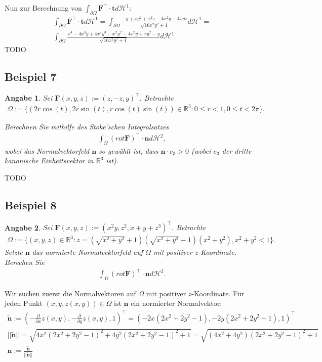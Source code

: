 \documentclass[]{article}
\newtheorem*{angabe*}{Angabe}
\begin{document}
Nun zur Berechnung von $\int_{\partial\Omega} \bm{F}^\top \cdot \bm{t} d\mathcal{H}^1$:
\begin{align*}
	\int_{\partial\Omega} \bm{F}^\top \cdot \bm{t} d\mathcal{H}^1 = \int_{\partial\Omega} \frac{-y + xy^2 + x^2z - 4x^2y - 4xyz}{\sqrt{16x^2y^2+1}} d\mathcal{H}^1 =\\
	\int_{\partial\Omega} \frac{x^4 - 4x^3y + 4x^2y^3 - x^2y^2 - 4x^2y + xy^2 - y}{\sqrt{16x^2y^2+1}} d\mathcal{H}^1
\end{align*}
TODO
\newpage
 
\subsection*{Beispiel 7}
\begin{angabe*}
	Sei $\bm{F}(x,y,z):=(z, -z, y)^\top$. Betrachte
	\begin{align*}
		\Omega := \{(2r\cos(t), 2r\sin(t), r\cos(t)\sin(t))\in \mathbb{R}^3: 0 \leq r < 1, 0 \leq t < 2\pi\}.
	\end{align*}
	
	Berechnen Sie mithilfe des Stoke'schen Integralsatzes
	\begin{align*}
		\int_\Omega (rot \bm{F})^\top \cdot \bm{n} d\mathcal{H}^2,
	\end{align*}
	wobei das Normalvektorfeld $\bm{n}$ so gewählt ist, dass $\bm{n}\cdot e_3 > 0$ (wobei $e_3$ der dritte kanonische Einheitsvektor in $\mathbb{R}^3$ ist).
\end{angabe*}
TODO

\subsection*{Beispiel 8}
\begin{angabe*}
	Sei $\bm{F}(x,y,z):=(x^2y, z^2, x+y+z^3)^\top$. Betrachte
	\begin{align*}
		\Omega := \{(x,y,z) \in \mathbb{R}^3: z=(\sqrt{x^2+y^2}+1)(\sqrt{x^2+y^2}-1)(x^2+y^2), x^2+y^2 < 1\}.
	\end{align*}
	Setzte $\bm{n}$ das normierte Normalvektorfeld auf $\Omega$ mit positiver $z$-Koordinate. Berechen Sie
	\begin{align*}
		\int_\Omega (rot \bm{F})^\top \cdot \bm{n} d\mathcal{H}^2.
	\end{align*}
\end{angabe*}

Wir suchen zuerst die Normalvektoren auf $\Omega$ mit positiver $z$-Koordinate. Für jeden Punkt $(x,y,z(x,y)) \in \Omega$ ist $\bm{n}$ ein normierter Normalvektor:
\begin{align*}
	\tilde{\bm{n}} := \left(-\frac{\partial}{\partial x} z(x,y), -\frac{\partial}{\partial y} z(x,y), 1\right)^\top = (-2x(2x^2+2y^2-1), -2y(2x^2+2y^2-1), 1)^\top\\
	||\tilde{\bm{n}}|| = \sqrt{4x^2(2x^2+2y^2-1)^2 + 4y^2(2x^2+2y^2-1)^2 + 1} = \sqrt{(4x^2+4y^2)(2x^2+2y^2-1)^2+1}\\
	\bm{n}:= \frac{\tilde{\bm{n}}}{||\tilde{\bm{n}}||}
\end{align*}
\end{document}
